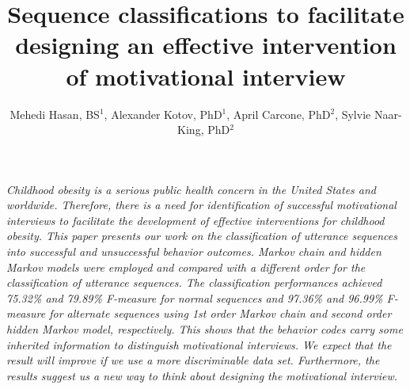 \documentclass{amia}
\begin{document}
\title{Sequence classifications to facilitate designing an effective intervention of motivational interview}

\author{Mehedi Hasan, BS$^{1}$, Alexander Kotov, PhD$^{1}$, April Carcone, PhD$^{2}$, Sylvie Naar-King, PhD$^{2}$}


\maketitle

\textit{Childhood obesity is a serious public health concern in the United States and worldwide. Therefore, there is a need for identification of successful motivational interviews to facilitate the development of effective interventions for childhood obesity. This paper presents our work on the classification of utterance sequences into successful and unsuccessful behavior outcomes. Markov chain and hidden Markov models were employed and compared with a different order for the classification of utterance sequences. The classification performances achieved 75.32\% and 79.89\% F-measure for normal sequences and 97.36\% and 96.99\% F-measure for alternate sequences using 1st order Markov chain and second order hidden Markov model, respectively. This shows that the behavior codes carry some inherited information to distinguish motivational interviews. We expect that the result will improve if we use a more discriminable data set. Furthermore, the results suggest us a new way to think about designing the motivational interview.}
\end{document}
